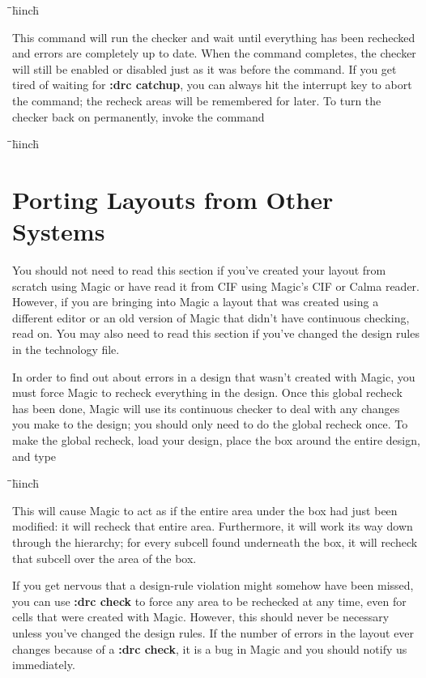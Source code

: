 \documentclass[letterpaper,twoside,12pt]{article}
\def\hinch{\hspace*{0.5in}}
\def\starti{\begin{center}\begin{tabbing}\hinch\=\hinch\=\hinch\=hinch\hinch\=\kill}
\def\endi{\end{tabbing}\end{center}}
\def\ii{\>\>\>}
\begin{document}
\starti
   \ii {\bfseries :drc catchup}
\endi

This command will run the checker and wait until everything
has been rechecked and errors are completely up to date.
When the command completes, the checker will still be enabled
or disabled just as it was before the command.
If you get tired of waiting for {\bfseries :drc catchup},
you can always hit the interrupt key to abort the command;
the recheck areas will be remembered for later.  To turn the
checker back on permanently, invoke the command

\starti
   \ii {\bfseries :drc on}
\endi

\section{Porting Layouts from Other Systems}

You should not need to read this section if you've created
your layout from scratch using Magic or have read it from
CIF using Magic's CIF or Calma reader.  However, if you are
bringing into Magic a layout that was created using a
different editor or an old version of Magic that didn't
have continuous checking, read on.  You may also need to
read this section if you've changed the design rules in
the technology file.

In order to find out about errors in a design that wasn't
created with Magic, you must force Magic
to recheck everything in the design.  Once this global recheck
has been done, Magic will use its continuous checker to deal
with any changes you make to the design; you should
only need to do the global recheck once.  To make the global recheck,
load your design, place the box around the entire design,
and type

\starti
   \ii {\bfseries :drc check}
\endi

This will cause Magic to act as if the entire area under the
box had just been modified:  it will recheck that entire area.
Furthermore, it will work its way down through the hierarchy;
for every subcell found underneath the box, it will recheck
that subcell over the area of the box.

If you get nervous that a design-rule violation might somehow have been
missed, you can use {\bfseries :drc check} to force any area
to be rechecked at any time, even for cells that were
created with Magic.  However, this should never be
necessary unless you've changed the design rules.  If the
number of errors in the layout ever changes
because of a {\bfseries :drc check}, it is a bug in Magic and you
should notify us immediately.
\end{document}
